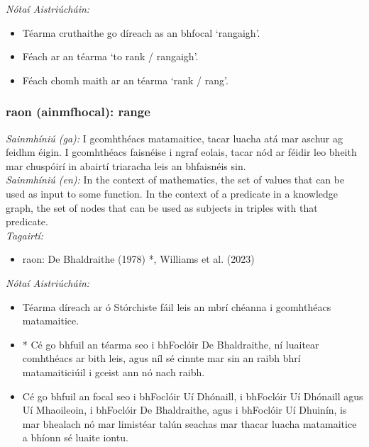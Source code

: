 \documentclass{article}
\begin{document}
 \noindent \textit{Nótaí Aistriúcháin:}
\begin{itemize}
	\item Téarma cruthaithe go díreach as an bhfocal `rangaigh'.
	\item Féach ar an téarma `to rank / rangaigh'.
	\item Féach chomh maith ar an téarma `rank / rang'.
\end{itemize}


\subsubsection*{raon (ainmfhocal): range}
 \noindent \textit{Sainmhíniú (ga):} I gcomhthéacs matamaitice, tacar luacha atá mar aschur ag feidhm éigin. I gcomhthéacs faisnéise i ngraf eolais, tacar nód ar féidir leo bheith mar chuspóirí in abairtí triaracha leis an bhfaisnéis sin.
\\
 \noindent \textit{Sainmhíniú (en):} In the context of mathematics, the set of values that can be used as input to some function. In the context of a predicate in a knowledge graph, the set of nodes that can be used as subjects in triples with that predicate.
\\
 \noindent \textit{Tagairtí:}
\begin{itemize}
	\item raon: De Bhaldraithe (1978) \cite{de-bhaldraithe}*, Williams et al. (2023) \cite{storchiste}
\end{itemize}

 \noindent \textit{Nótaí Aistriúcháin:}
\begin{itemize}
	\item Téarma díreach ar ó Stórchiste fáil leis an mbrí chéanna i gcomhthéacs matamaitice.
	\item * Cé go bhfuil an téarma seo i bhFoclóir De Bhaldraithe, ní luaitear comhthéacs ar bith leis, agus níl sé cinnte mar sin an raibh bhrí matamaiticiúil i gceist ann nó nach raibh.
	\item Cé go bhfuil an focal seo i bhFoclóir Uí Dhónaill, i bhFoclóir Uí Dhónaill agus Uí Mhaoileoin, i bhFoclóir De Bhaldraithe, agus i bhFoclóir Uí Dhuinín, is mar bhealach nó mar limistéar talún seachas mar thacar luacha matamaitice a bhíonn sé luaite iontu.
\end{itemize}
\end{document}
